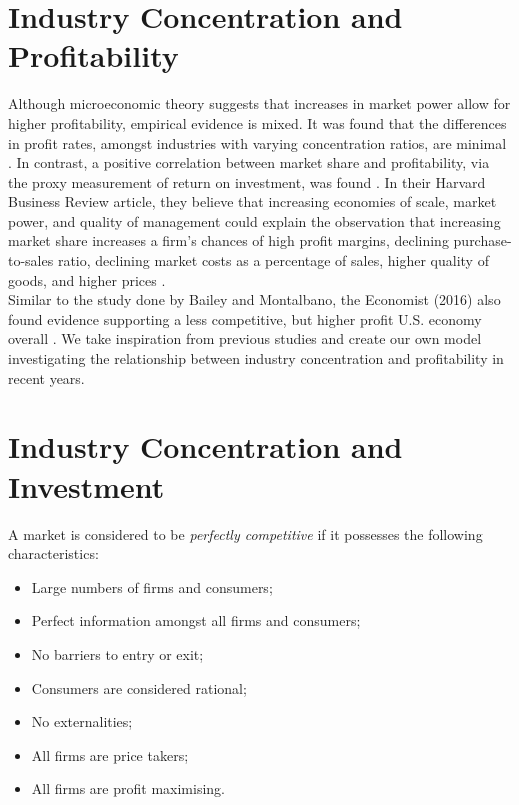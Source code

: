 \section{Industry Concentration and Profitability}
\label{sec:sec02}

Although microeconomic theory suggests that increases in market power allow for higher profitability, empirical evidence is mixed. It was found that the differences in profit rates, amongst industries with varying concentration ratios, are minimal \cite[Gort and Singamsetti, 1976]{Gort1976}. In contrast, a positive correlation between market share and profitability, via the proxy measurement of return on investment, was found \cite[Buzzell et al., 1975]{Buzzell1975}. In their Harvard Business Review article, they believe that increasing economies of scale, market power, and quality of management could explain the observation that increasing market share increases a firm’s chances of high profit margins, declining purchase-to-sales ratio, declining market costs as a percentage of sales, higher quality of goods, and higher prices \cite[Buzzell et al., 1975]{Buzzell1975}. \\

Similar to the study done by Bailey and Montalbano, the Economist (2016) also found evidence supporting a less competitive, but higher profit U.S. economy overall \cite[The Economist, 2016]{Economist2016}. We take inspiration from previous studies and create our own model investigating the relationship between industry concentration and profitability in recent years. \\

\section{Industry Concentration and Investment}
\label{sec:sec03}

\begin{dfn}
	A market is considered to be \textit{perfectly competitive} if it possesses the following characteristics: \cite[Romer, 2012]{Romer2012}
    \begin{itemize}
    \item Large numbers of firms and consumers;
    \item Perfect information amongst all firms and consumers;
    \item No barriers to entry or exit;
    \item Consumers are considered rational;
    \item No externalities;
    \item All firms are price takers;
    \item All firms are profit maximising.
    \end{itemize}
\end{dfn}

